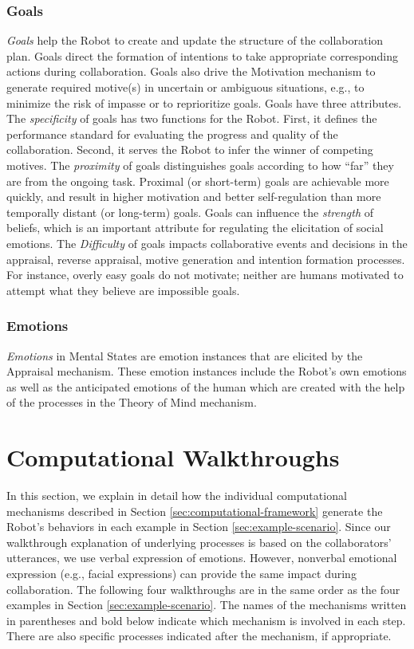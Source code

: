 \subsubsection{Goals}
\label{sec:goals}

\textit{Goals} help the Robot to create and update the structure of the
collaboration plan. Goals direct the formation of intentions to take appropriate
corresponding actions during collaboration. Goals also drive the Motivation
mechanism to generate required motive(s) in uncertain or ambiguous situations,
e.g., to minimize the risk of impasse or to reprioritize goals. Goals have
three attributes. The \textit{specificity} of goals has two functions for the
Robot. First, it defines the performance standard for evaluating the progress
and quality of the collaboration. Second, it serves the Robot to infer the
winner of competing motives. The \textit{proximity} of goals distinguishes goals
according to how ``far'' they are from the ongoing task. Proximal (or
short-term) goals are achievable more quickly, and result in higher motivation
and better self-regulation than more temporally distant (or long-term) goals.
Goals can influence the \textit{strength} of beliefs, which is an important
attribute for regulating the elicitation of social emotions. The
\textit{Difficulty} of goals impacts collaborative events and decisions in the
appraisal, reverse appraisal, motive generation and intention formation
processes. For instance, overly easy goals do not motivate; neither are humans
motivated to attempt what they believe are impossible goals.

\subsubsection{Emotions}

\textit{Emotions} in Mental States are emotion instances that are elicited by
the Appraisal mechanism. These emotion instances include the Robot's own
emotions as well as the anticipated emotions of the human which are created with
the help of the processes in the Theory of Mind mechanism.

\section{Computational Walkthroughs}
\label{sec:wtce}

In this section, we explain in detail how the individual computational
mechanisms described in Section \ref{sec:computational-framework} generate the
Robot's behaviors in each example in Section \ref{sec:example-scenario}. Since
our walkthrough explanation of underlying processes is based on the
collaborators' utterances, we use verbal expression of emotions. However,
nonverbal emotional expression (e.g., facial expressions) can provide the same
impact during collaboration. The following four walkthroughs are in the same
order as the four examples in Section \ref{sec:example-scenario}. The names of
the mechanisms written in parentheses and bold below indicate which mechanism
is involved in each step. There are also specific processes indicated after the
mechanism, if appropriate.

